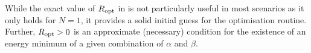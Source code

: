 While the exact value of $R_{\rm opt}$ in  is not particularly useful in most scenarios as it only holds for $N = 1$, it provides a solid initial guess for the optimisation routine.
Further, $R_{\rm opt} > 0$ is an approximate (necessary) condition for the existence of an energy minimum of a given combination of $\alpha$ and $\beta$.
